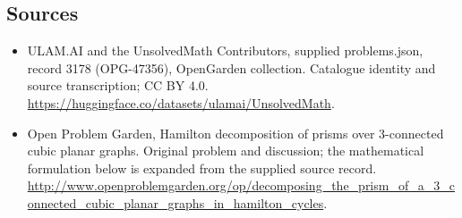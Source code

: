 \documentclass[11pt,a4paper]{article}
\begin{document}
\subsection{Sources}
\begin{itemize}
\item[S1] ULAM.AI and the UnsolvedMath Contributors, supplied problems.json, record 3178 (OPG-47356), OpenGarden collection. Catalogue identity and source transcription; CC BY 4.0.
\url{https://huggingface.co/datasets/ulamai/UnsolvedMath}.
\item[S2] Open Problem Garden, Hamilton decomposition of prisms over 3-connected cubic planar graphs. Original problem and discussion; the mathematical formulation below is expanded from the supplied source record.
\url{http://www.openproblemgarden.org/op/decomposing_the_prism_of_a_3_connected_cubic_planar_graphs_in_hamilton_cycles}.

\end{itemize}
\end{document}
